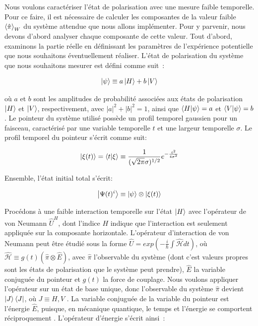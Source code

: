 \begin{onehalfspace}
    Nous voulons caractériser l'état de polarisation avec une mesure 
    faible temporelle. Pour ce faire, il est nécessaire de calculer 
    les composantes de la valeur faible $\expval{\hat{\pi}}_W$ du 
    système attendue que nous allons implémenter. Pour y parvenir, nous devons 
    d’abord analyser chaque composante de cette valeur. Tout d’abord, 
    examinons la partie réelle en définissant les paramètres de 
    l’expérience potentielle que nous souhaitons éventuellement réaliser. 
    L’état de polarisation du système que nous souhaitons mesurer est 
    défini comme suit :

    \begin{equation}
        \ket{\psi} \equiv a\ket{H} + b\ket{V}
    \end{equation}

    \noindent où $a$ et $b$ sont les amplitudes de probabilité associées aux états de polarisation 
    $\ket{H}$ et $\ket{V}$, respectivement, avec 
    $|a|^2 + |b|^2 = 1$, ainsi que 
    $\bra{H}\ket{\psi} = a$ et $\bra{V}\ket{\psi} = b$.
    Le pointeur du système utilisé possède un profil temporel 
    gaussien pour un faisceau, caractérisé par une variable temporelle 
    $t$ et une largeur temporelle $\sigma$. Le profil temporel du pointeur
    s’écrit comme suit:
    
    \begin{equation}
        \ket{\xi(t)} = \bra{t}\ket{\xi} \equiv \frac{1}{(\sqrt{2\pi}\sigma)^{1/2}}e^{-\frac{t^2}{4\sigma^2}}
    \end{equation}

    \noindent Ensemble, l’état initial total s’écrit:

    \begin{equation}
        \ket{\Psi(t)^i} \equiv \ket{\psi} \otimes \ket{\xi(t)}
    \end{equation}


    \noindent Procédons à une faible interaction temporelle sur l’état 
    $\ket{H}$ avec l’opérateur de von Neumann $\hat{U}^H$, dont l’indice 
    $H$ indique que l'interaction est seulement appliquée sur la composante horizontale. L’opérateur 
    d’interaction de von Neumann peut être étudié sous la forme 
    $\hat{U} = exp(-\frac{i}{\hbar}\int \mathcal{\hat{H}}dt)$, où 
    $\mathcal{\hat{H}} \equiv g(t)(\hat{\pi}\otimes\hat{E})$, avec 
    $\hat{\pi}$ l'observable du système (dont c'est valeurs propres sont les états de polarisation que le système peut prendre), 
    $\hat{E}$ la variable conjuguée du pointeur et $g(t)$ la force de couplage. Nous voulons appliquer 
    l’opérateur sur un état de base unique, donc l’observable du système 
    $\hat{\pi}$ devient $\ket{J}\bra{J}$, où $J \equiv H,V$ 
    \cite{Lundeen_Bamber}. La variable conjuguée de 
    la variable du pointeur est l'énergie $\hat{E}$, puisque, en 
    mécanique quantique, le temps et l’énergie se 
    comportent réciproquement \cite{Peebles,Griffiths}. L’opérateur 
    d’énergie s’écrit ainsi :


\end{onehalfspace}
